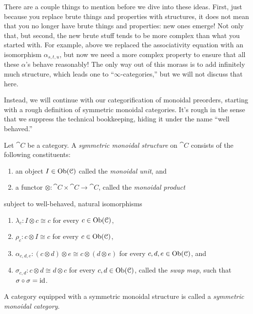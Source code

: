 \documentclass[7Sketches]{subfiles}
\begin{document}
There are a couple things to mention before we dive into these ideas. First,
just because you replace brute things and properties with structures, it does
not mean that you no longer have brute things and properties: new ones emerge!
Not only that, but second, the new brute stuff tends to be more complex than
what you started with. For example, above we replaced the associativity equation
with an isomorphism $\alpha_{s,t,u}$, but now we need a more complex property to
ensure that all these $\alpha$'s behave reasonably! The only way out of this morass is to
add infinitely much structure, which leads one to ``$\infty$-categories,'' but
we will not discuss that here.

Instead, we will continue with our categorification of monoidal preorders, starting
with a rough definition of symmetric monoidal categories. It's rough in the
sense that we suppress the technical bookkeeping, hiding it under the name
``well behaved.''

\begin{roughDef}%
\label{rdef.sym_mon_cat}%
%
Let $\cat{C}$ be a category. A \emph{symmetric monoidal structure} on $\cat{C}$ consists of the following constituents:
\begin{enumerate}[label=(\roman*)]
	\item an object $I\in\operatorname{Ob}(\mathcal{C})$ called the \emph{monoidal unit}, and
	\item a functor $\otimes\colon\cat{C}\times\cat{C}\to\cat{C}$, called the \emph{monoidal product}
\end{enumerate}
subject to well-behaved, natural isomorphisms
\begin{enumerate}[label=(\alph*)]
	\item $\lambda_c\colon I\otimes c\cong c$ for every $c\in\operatorname{Ob}(\mathcal{C})$,
	\item $\rho_c\colon c\otimes I\cong c$ for every $c\in\operatorname{Ob}(\mathcal{C})$,
	\item $\alpha_{c,d,e}\colon (c\otimes d)\otimes e\cong c\otimes(d\otimes e)$ for every $c,d,e\in\operatorname{Ob}(\mathcal{C})$, and
	\item $\sigma_{c,d}\colon c\otimes	d\cong d \otimes c$ for every $c,d\in\operatorname{Ob}(\mathcal{C})$, called the \emph{swap map}, such that $\sigma\circ\sigma=\mathrm{id}$.
\end{enumerate}
A category equipped with a symmetric monoidal structure is called a
\emph{symmetric monoidal category}.
\end{roughDef}
\end{document}

